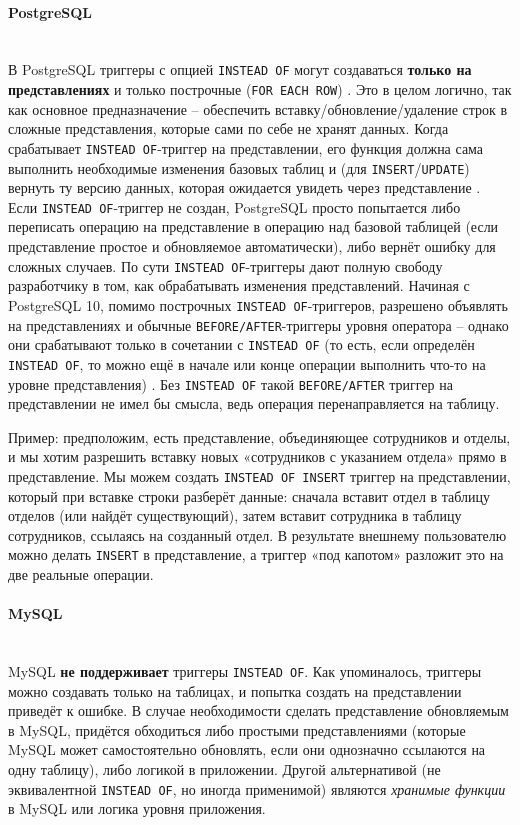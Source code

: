 \paragraph{\textbf{PostgreSQL}} ~\\
 В PostgreSQL триггеры с опцией \texttt{INSTEAD OF} могут создаваться \textbf{только на представлениях} и только построчные (\texttt{FOR EACH ROW}) \autocite{PostgreSQLdocc37}. Это в целом логично, так как основное предназначение – обеспечить вставку/обновление/удаление строк в сложные представления, которые сами по себе не хранят данных. Когда срабатывает \texttt{INSTEAD OF}-триггер на представлении, его функция должна сама выполнить необходимые изменения базовых таблиц и (для \texttt{INSERT}/\texttt{UPDATE}) вернуть ту версию данных, которая ожидается увидеть через представление \autocite{PostgreSQLdocc37}. Если \texttt{INSTEAD OF}-триггер не создан, PostgreSQL просто попытается либо переписать операцию на представление в операцию над базовой таблицей (если представление простое и обновляемое автоматически), либо вернёт ошибку для сложных случаев. 
 По сути \texttt{INSTEAD OF}-триггеры дают полную свободу разработчику в том, как обрабатывать изменения представлений. Начиная с PostgreSQL 10, помимо построчных \texttt{INSTEAD OF}-триггеров, разрешено объявлять на представлениях и обычные \texttt{BEFORE/AFTER}-триггеры уровня оператора – однако они срабатывают только в сочетании с \texttt{INSTEAD OF} (то есть, если определён \texttt{INSTEAD OF}, то можно ещё в начале или конце операции выполнить что-то на уровне представления) \autocite{PostgreSQLdocc37}. Без \texttt{INSTEAD OF} такой \texttt{BEFORE/AFTER} триггер на представлении не имел бы смысла, ведь операция перенаправляется на таблицу.

 Пример: предположим, есть представление, объединяющее сотрудников и отделы, и мы хотим разрешить вставку новых «сотрудников с указанием отдела» прямо в представление. Мы можем создать \texttt{INSTEAD OF INSERT} триггер на представлении, который при вставке строки разберёт данные: сначала вставит отдел в таблицу отделов (или найдёт существующий), затем вставит сотрудника в таблицу сотрудников, ссылаясь на созданный отдел. В результате внешнему пользователю можно делать \texttt{INSERT} в представление, а триггер «под капотом» разложит это на две реальные операции.

\paragraph{\textbf{MySQL}} ~\\
 MySQL \textbf{не поддерживает} триггеры \texttt{INSTEAD OF}. Как упоминалось, триггеры можно создавать только на таблицах, и попытка создать на представлении приведёт к ошибке. В случае необходимости сделать представление обновляемым в MySQL, придётся обходиться либо простыми представлениями (которые MySQL может самостоятельно обновлять, если они однозначно ссылаются на одну таблицу), либо логикой в приложении. Другой альтернативой (не эквивалентной \texttt{INSTEAD OF}, но иногда применимой) являются \textit{хранимые функции} в MySQL или логика уровня приложения.

